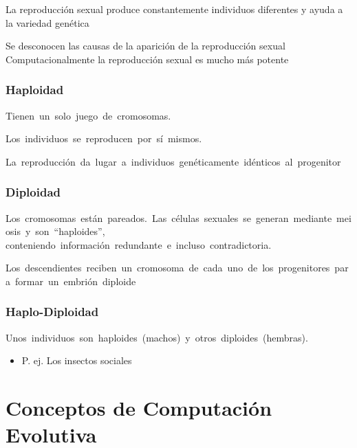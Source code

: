 \documentclass[12pt, twoside, openright]{report} %
\begin{document}
La reproducción sexual produce constantemente individuos diferentes y ayuda a la variedad genética

Se desconocen las causas de la aparición de la reproducción sexual Computacionalmente la reproducción sexual es mucho más potente

\subsubsection{Haploidad}
Tienen un solo juego de cromosomas.

Los individuos se reproducen por sí mismos.

La reproducción da lugar a individuos genéticamente idénticos al progenitor

\subsubsection{Diploidad}
Los cromosomas están pareados. Las células sexuales se generan mediante meiosis y son “haploides”, conteniendo información redundante e incluso contradictoria. 

Los descendientes reciben un cromosoma de cada uno de los progenitores para formar un embrión diploide

\subsubsection{Haplo-Diploidad}
Unos individuos son haploides (machos) y otros diploides (hembras).
\begin{itemize}
	\item P. ej. Los insectos sociales
\end{itemize}
\pagebreak

\section{Conceptos de Computación Evolutiva}
\end{document}
